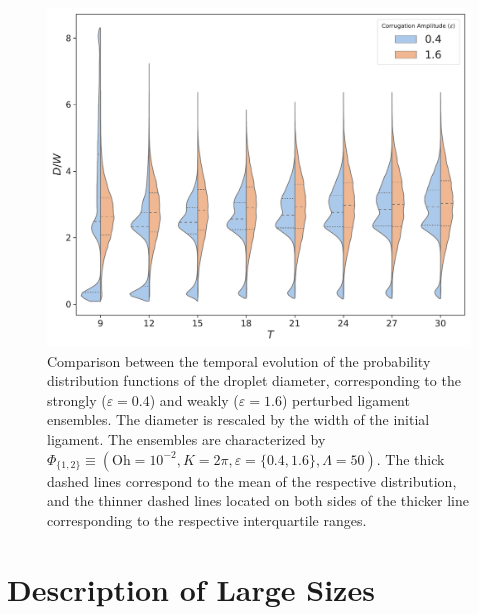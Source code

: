 

\begin{figure}
\centering
\includegraphics{plots/drop_stats/amp_dist_compare_new.pdf}
\caption{Comparison between the temporal evolution of the probability distribution functions of the
	droplet diameter, corresponding to the strongly ($\varepsilon = 0.4$) and 
	weakly ($\varepsilon = 1.6$) perturbed ligament ensembles. 
	The diameter is rescaled by the width of the initial ligament. 
	The ensembles are characterized by $\Phi_{\{1,2\}} \equiv \left( \textrm{Oh} = 10^{-2}, K = 2\pi 
, \varepsilon = \{0.4,1.6 \} , \Lambda = 50 \right)$. 
The thick dashed lines correspond to the mean of the respective distribution, and the thinner
dashed lines located on both sides of the thicker line corresponding to the respective interquartile ranges. 
	}
\label{tseries_comp}
\end{figure}


\section{Description of Large Sizes}


